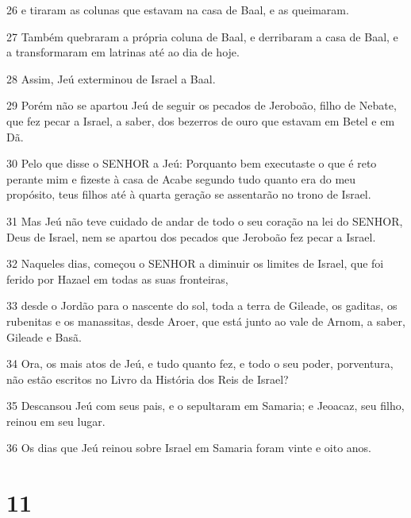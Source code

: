 \par 26 e tiraram as colunas que estavam na casa de Baal, e as queimaram.
\par 27 Também quebraram a própria coluna de Baal, e derribaram a casa de Baal, e a transformaram em latrinas até ao dia de hoje.
\par 28 Assim, Jeú exterminou de Israel a Baal.
\par 29 Porém não se apartou Jeú de seguir os pecados de Jeroboão, filho de Nebate, que fez pecar a Israel, a saber, dos bezerros de ouro que estavam em Betel e em Dã.
\par 30 Pelo que disse o SENHOR a Jeú: Porquanto bem executaste o que é reto perante mim e fizeste à casa de Acabe segundo tudo quanto era do meu propósito, teus filhos até à quarta geração se assentarão no trono de Israel.
\par 31 Mas Jeú não teve cuidado de andar de todo o seu coração na lei do SENHOR, Deus de Israel, nem se apartou dos pecados que Jeroboão fez pecar a Israel.
\par 32 Naqueles dias, começou o SENHOR a diminuir os limites de Israel, que foi ferido por Hazael em todas as suas fronteiras,
\par 33 desde o Jordão para o nascente do sol, toda a terra de Gileade, os gaditas, os rubenitas e os manassitas, desde Aroer, que está junto ao vale de Arnom, a saber, Gileade e Basã.
\par 34 Ora, os mais atos de Jeú, e tudo quanto fez, e todo o seu poder, porventura, não estão escritos no Livro da História dos Reis de Israel?
\par 35 Descansou Jeú com seus pais, e o sepultaram em Samaria; e Jeoacaz, seu filho, reinou em seu lugar.
\par 36 Os dias que Jeú reinou sobre Israel em Samaria foram vinte e oito anos.

\chapter{11}

